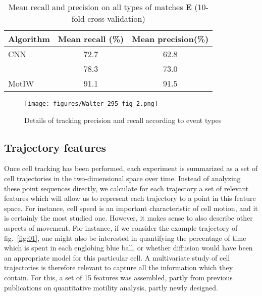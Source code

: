 
\begin{table}[!ht]
\centering
\caption{Mean recall and precision on all types of matches $\mathbf{E}$ (10-fold cross-validation)\label{accuracy}}{
\begin{tabular}{l|c|c}
Algorithm & Mean recall (\%) & Mean precision(\%)\\
\hline
CNN & 72.7 & 62.8 \\
\cite{jaqaman} & 78.3 & 73.0 \\
MotIW  & 91.1 & 91.5 \\
\end{tabular}}

\end{table}
\begin{figure}[ht]
\centerline{\texttt{[image: figures/Walter\_295\_fig\_2.png]}}
\caption{Details of tracking precision and recall according to event types}
\label{details}
\end{figure}



\subsection{Trajectory features}
\label{sec:features}
Once cell tracking has been performed, each experiment is summarized
as a set of cell trajectories in the two-dimensional space over
time. Instead of analyzing these point sequences directly, we
calculate for each trajectory a set of relevant features which will allow us to
represent each trajectory to a point in this feature space. 
For instance, cell speed is an important characteristic of cell motion, and it
is certainly the most studied one. However, it makes sense to also
describe other aspects of movement. For instance, if we consider the example
trajectory of fig.~\ref{fig:01}, one might also be interested in
quantifying the percentage of time which is spent in each englobing
blue ball, or whether diffusion would have been an appropriate model
for this particular cell. A multivariate study of cell trajectories is
therefore relevant to capture all the information which they
contain. For this, a set of 15 features was assembled, partly from previous
publications on quantitative motility analysis, partly newly
designed. 

